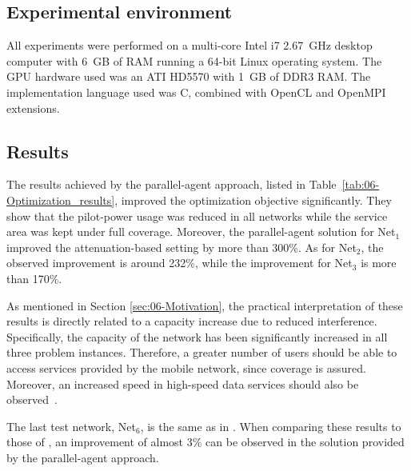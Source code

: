 \subsection{Experimental environment}

All experiments were performed on a multi-core Intel i7 2.67~GHz
desktop computer with 6~GB of RAM running a 64-bit Linux operating
system. The GPU hardware used was an ATI HD5570 with 1~GB of DDR3
RAM. The implementation language used was C, combined with OpenCL
and OpenMPI extensions.


\subsection{Results}

The results achieved by the parallel-agent approach, listed in Table~\ref{tab:06-Optimization_results},
improved the optimization objective significantly. They show that
the pilot-power usage was reduced in all networks while the service
area was kept under full coverage. Moreover, the parallel-agent solution
for Net$_{1}$ improved the attenuation-based setting by more than
300\%. As for Net$_{2}$, the observed improvement is around 232\%,
while the improvement for Net$_{3}$ is more than 170\%. 

As mentioned in Section \ref{sec:06-Motivation}, the practical interpretation
of these results is directly related to a capacity increase due to
reduced interference. Specifically, the capacity of the network has
been significantly increased in all three problem instances. Therefore,
a greater number of users should be able to access services provided
by the mobile network, since coverage is assured. Moreover, an increased
speed in high-speed data services should also be observed~\cite{Holma_WCDMA.for.UMTS:2005}.

The last test network, Net$_{6}$, is the same as in \cite{Siomina:Minimum.pilot.power.for.service.coverage}.
When comparing these results to those of \cite{Siomina:Minimum.pilot.power.for.service.coverage},
an improvement of almost 3\% can be observed in the solution provided
by the parallel-agent approach.

